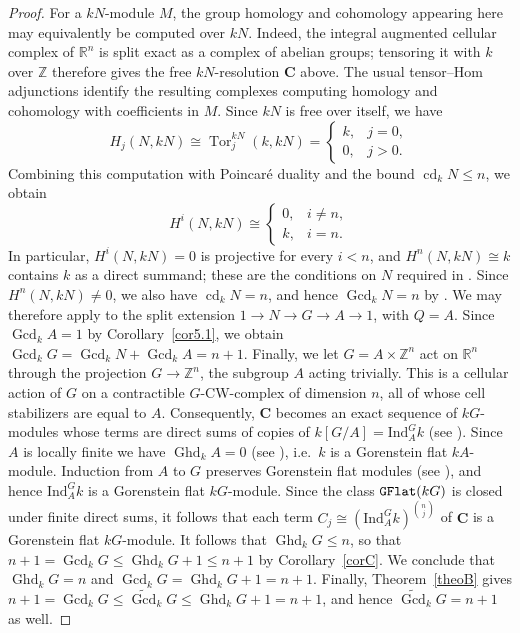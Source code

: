 \documentclass[12pt]{amsart}
\theoremstyle{remark}
\theoremstyle{definition}
\theoremstyle{plain}
\DeclareMathOperator{\Ghd}{Ghd}
\DeclareMathOperator{\Gcd}{Gcd}
\DeclareMathOperator{\cd}{cd}
\newcommand{\PGFcd}{\widetilde{\Gcd}}
\begin{document}
\begin{proof}
For a $kN$-module $M$, the group homology and cohomology
appearing here may equivalently be computed over $kN$.
Indeed, the integral augmented cellular complex of
$\mathbb R^n$ is split exact as a complex of abelian groups;
tensoring it with $k$ over $\mathbb Z$ therefore gives the
free $kN$-resolution $\mathbf C$ above. The usual
tensor--Hom adjunctions identify the resulting complexes
computing homology and cohomology with coefficients in $M$.
Since $kN$ is free over itself, we have
\[
H_j(N,kN)
\cong \operatorname{Tor}^{kN}_j(k,kN)
=
\begin{cases}
k, & j=0,\\
0, & j>0.
\end{cases}
\]
Combining this computation with Poincar\'e duality and the
bound $\operatorname{cd}_k N\leq n$, we obtain
\[
H^i(N,kN)\cong
\begin{cases}
0, & i\neq n,\\[1mm]
k, & i=n.
\end{cases}
\]
In particular, $H^i(N,kN)=0$ is projective for every $i<n$, and $H^n(N,kN)\cong k$ contains $k$ as a direct summand; these are the conditions on $N$ required in \cite[Theorem~4.5]{ET3}. Since $H^n(N,kN)\neq0$, we also have $\cd_k N=n$, and hence $\Gcd_k N=n$ by \cite[Proposition 2.27]{Hol}. We may therefore apply \cite[Theorem~4.5]{ET3} to the split extension $1\rightarrow N\rightarrow G\rightarrow A\rightarrow1$, with $Q=A$. Since $\Gcd_kA=1$ by Corollary~\ref{cor5.1}, we obtain $\Gcd_kG=\Gcd_k N+\Gcd_kA=n+1$. Finally, we let $G=A\times\mathbb Z^n$ act on $\mathbb R^n$ through the projection $G\rightarrow\mathbb Z^n$, the subgroup $A$ acting trivially. This is a cellular action of $G$ on a contractible $G$-CW-complex of dimension $n$, all of whose cell stabilizers are equal to $A$. Consequently, $\mathbf C$ becomes an exact sequence of $kG$-modules whose terms are direct sums of copies of $k[G/A]=\mathrm{Ind}^G_Ak$ (see \cite[Lemma~3.1]{Bis}). Since $A$ is locally finite we have $\Ghd_kA=0$ (see \cite[Theorem~1.4]{KS}), i.e.\ $k$ is a Gorenstein flat $kA$-module. Induction from $A$ to $G$ preserves Gorenstein flat modules (see \cite[Lemma~2.9(i)]{KS}), and hence $\mathrm{Ind}^G_Ak$ is a Gorenstein flat $kG$-module. Since the class ${\tt GFlat}(kG)$ is closed under finite direct sums, it follows that each term
$C_j\cong(\mathrm{Ind}^G_Ak)^{\binom{n}{j}}$ of $\mathbf C$ is a Gorenstein flat $kG$-module. It follows that $\Ghd_kG\le n$, so that $n+1=\Gcd_kG\le\Ghd_kG+1\le n+1$ by Corollary~\ref{corC}. We conclude that $\Ghd_kG=n$ and $\Gcd_kG=\Ghd_kG+1=n+1$. Finally, Theorem~\ref{theoB} gives $n+1=\Gcd_kG\le\PGFcd_kG\le\Ghd_kG+1=n+1$, and hence $\PGFcd_kG=n+1$ as well.
\end{proof}
\end{document}

